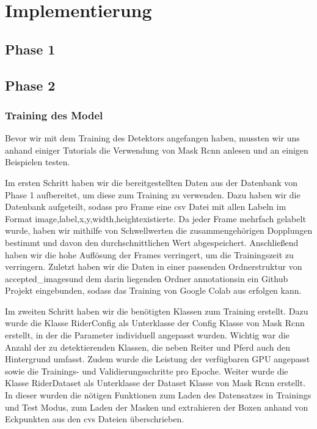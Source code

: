 \chapter{Implementierung}
\label{ch:implementierung}

\section{Phase 1}

\section{Phase 2}
\subsection{Training des Model}
Bevor wir mit dem Training des Detektors angefangen haben, mussten wir uns anhand einiger Tutorials die Verwendung von Mask Rcnn anlesen und an einigen Beispielen testen. 

Im ersten Schritt haben wir die bereitgestellten Daten aus der Datenbank von Phase 1 aufbereitet, um diese zum Training zu verwenden. Dazu haben wir die Datenbank aufgeteilt, sodass pro Frame eine csv Datei mit allen Labeln im Format \dq image,label,x,y,width,height\dq existierte. Da jeder Frame mehrfach gelabelt wurde, haben wir mithilfe von Schwellwerten die zusammengehörigen Dopplungen bestimmt und davon den durchschnittlichen Wert abgespeichert. Anschließend haben wir die hohe Auflösung der Frames verringert, um die Trainingszeit zu verringern. Zuletzt haben wir die Daten in einer passenden Ordnerstruktur von \dq accepted_images\dq und dem darin liegenden Ordner \dq annotations\dq in ein Github Projekt eingebunden, sodass das Training von Google Colab aus erfolgen kann.

Im zweiten Schritt haben wir die benötigten Klassen zum Training erstellt. Dazu wurde die Klasse RiderConfig als Unterklasse der Config Klasse von Mask Rcnn erstellt, in der die Parameter individuell angepasst wurden. Wichtig war die Anzahl der zu detektierenden Klassen, die neben Reiter und Pferd auch den Hintergrund umfasst. Zudem wurde die Leistung der verfügbaren GPU angepasst sowie die Trainings- und Validierungsschritte pro Epoche. 
Weiter wurde die Klasse RiderDataset als Unterklasse der Dataset Klasse von Mask Rcnn erstellt. In dieser wurden die nötigen Funktionen zum Laden des Datensatzes in Trainings und Test Modus, zum Laden der Masken und extrahieren der Boxen anhand von Eckpunkten aus den cvs Dateien überschrieben.

